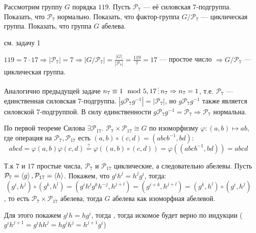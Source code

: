 \begin{exercise}
    Рассмотрим группу \(G\) порядка \(119\). Пусть \(\mathcal{P}_7\) --- её силовская \(7\)-подгруппа. Показать, что \(\mathcal{P}_7\) нормально. Показать, что фактор-группа \(G / \mathcal{P}_7\) --- циклическая группа. Показать, что группа \(G\) абелева.
    \begin{remark}
        см. задачу 1
    \end{remark}
\end{exercise}
\begin{solution}
    \(119 = 7 \cdot 17 \Rightarrow |\mathcal{P}_7| = 7 \Rightarrow |G / \mathcal{P}_7| = \frac{|G|}{|\mathcal{P}_7|} = \frac{119}{7} = 17\) --- простое число \( \Rightarrow G / \mathcal{P}_7\) --- циклическая группа.

    Аналогично предыдущей задаче \(n_7 \equiv 1 \mod 5, 17 \divided n_7 \Rightarrow n_7 = 1\), т.е. \(\mathcal{P}_7\) --- единственная силовская \(7\)-подгруппа. \(|g\mathcal{P}_7g^{-1}| = |\mathcal{P}_7|\), но \(g\mathcal{P}_7g^{-1}\) также является силовской \(7\)-подгруппой. В силу единственности \(g\mathcal{P}_7g^{-1} = \mathcal{P}_7 \Rightarrow \mathcal{P}_7\) нормальна.

    По первой теореме Силова \(\exists \mathcal{P}_{17}\). \(\mathcal{P}_{7} \times \mathcal{P}_{17} \cong G\) по изоморфизму \(\varphi : (a, b) \mapsto ab\), где операция на \(\mathcal{P}_7, \mathcal{P}_{17}\) есть \((a, b) \circ (c, d) = (abcb^{-1}, bd)\):
    \[abcd = \varphi(a, b) \varphi(c, d) \stackrel{?}{=} \varphi((a, b) \circ (c, d)) = \varphi((abcb^{-1}, bd)) = abcd\]

    Т.к \(7\) и \(17\) простые числа, \(\mathcal{P}_7\) и \(\mathcal{P}_{17}\) циклические, а следовательно абелевы. Пусть \(\mathcal{P}_7 = \ev{g}, \mathcal{P}_{17} = \ev{h}\). Покажем, что \(g^ih^j = h^jg^i\), тогда:
    \[(g^i, h^j) \circ (g^k, h^l) = (g^ih^jg^kh^{-j}, h^{j + l}) = (g^{i + k}, h^{j + l}) = (g^k, h^l) \circ (g^i, h^j)\]
    , то есть \(\mathcal{P}_7 \times \mathcal{P}_{17}\) абелева, тогда \(G\) абелева как изоморфная абелевой.

    Для этого покажем \(g^ih = hg^i\), тогда , тогда искомое будет верно по индукции (\(g^ih^{j + 1} = g^ih h^j = hg^i h^j = h^{j+1}g^i\))


\end{solution}
